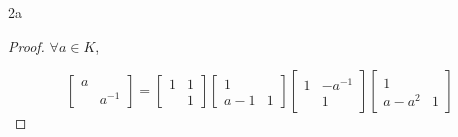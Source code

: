 \documentclass{article}
\begin{document}
\begin{PROB}{2a}\label{Problem 2a.}
\end{PROB}
\begin{proof}
    $\forall a \in K$, 
    
    \[\begin{bmatrix}
        a \\ & a^{-1}
    \end{bmatrix} = \begin{bmatrix}
        1 & 1 \\ & 1
    \end{bmatrix} \begin{bmatrix}
        1 \\ a - 1 & 1
    \end{bmatrix} \begin{bmatrix}
        1 & -a^{-1} \\ & 1
    \end{bmatrix} \begin{bmatrix}
        1 & \\ a - a^{2} & 1
    \end{bmatrix} \]
\end{proof}
\end{document}
